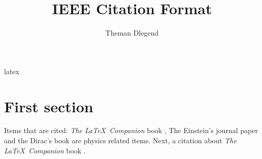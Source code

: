 latex\documentclass{article}
\title{IEEE Citation Format}
\author{Theman Dlegend}
\begin{document}
\maketitle

\section{First section}

\lipsum
Items that are cited: \textit{The \LaTeX\ Companion} book \cite{latexcompanion}, The Einstein's journal paper \cite{einstein} and the Dirac's book \cite{dirac} are physics related items. Next, a citation about \textit{The \LaTeX\ Companion} book \cite{latexcompanion}.

\medskip


\end{document}

